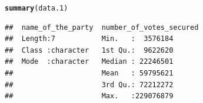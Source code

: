 \documentclass[11pt, a4paper]{article}\usepackage[]{graphicx}\usepackage[]{xcolor}
\makeatletter
\newcommand{\hldef}[1]{\textcolor[rgb]{0.345,0.345,0.345}{#1}}%
\newcommand{\hlkwd}[1]{\textcolor[rgb]{0.737,0.353,0.396}{\textbf{#1}}}%
\newenvironment{kframe}{%
 \def\at@end@of@kframe{}%
 \ifinner\ifhmode%
  \def\at@end@of@kframe{\end{minipage}}%
  \begin{minipage}{\columnwidth}%
 \fi\fi%
 \def\FrameCommand##1{\hskip\@totalleftmargin \hskip-\fboxsep
 \colorbox{shadecolor}{##1}\hskip-\fboxsep
     \hskip-\linewidth \hskip-\@totalleftmargin \hskip\columnwidth}%
 \MakeFramed {\advance\hsize-\width
   \@totalleftmargin\z@ \linewidth\hsize
   \@setminipage}}%
 {\par\unskip\endMakeFramed%
 \at@end@of@kframe}
\newenvironment{knitrout}{}{} %
\makeatother
\begin{document}
\begin{knitrout}
\color{fgcolor}\begin{kframe}
\begin{alltt}
\hlkwd{summary}\hldef{(data.1)}
\end{alltt}
\begin{verbatim}
##  name_of_the_party  number_of_votes_secured
##  Length:7           Min.   :  3576184      
##  Class :character   1st Qu.:  9622620      
##  Mode  :character   Median : 22246501      
##                     Mean   : 59795621      
##                     3rd Qu.: 72212272      
##                     Max.   :229076879
\end{verbatim}
\end{kframe}
\end{knitrout}
\end{document}
